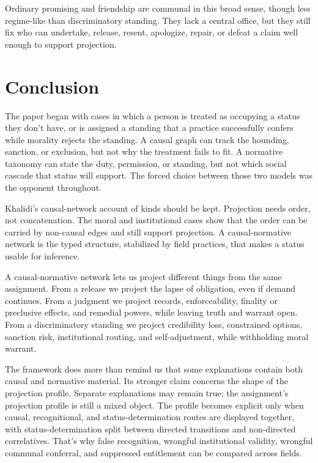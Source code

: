\documentclass[12pt]{article}
\begin{document}
Ordinary promising and friendship are communal in this broad sense, though less regime-like than discriminatory standing. They lack a central office, but they still fix who can undertake, release, resent, apologize, repair, or defeat a claim well enough to support projection.

\section{Conclusion}
\label{sec:conclusion}

The paper began with cases in which a person is treated as occupying a status they don't have, or is assigned a standing that a practice successfully confers while morality rejects the standing. A causal graph can track the hounding, sanction, or exclusion, but not why the treatment fails to fit. A normative taxonomy can state the duty, permission, or standing, but not which social cascade that status will support. The forced choice between those two models was the opponent throughout.

Khalidi's causal-network account of kinds should be kept. Projection needs order, not concatenation. The moral and institutional cases show that the order can be carried by non-causal edges and still support projection. A causal-normative network is the typed structure, stabilized by field practices, that makes a status usable for inference.

A causal-normative network lets us project different things from the same assignment. From a release we project the lapse of obligation, even if demand continues. From a judgment we project records, enforceability, finality or preclusive effects, and remedial powers, while leaving truth and warrant open. From a discriminatory standing we project credibility loss, constrained options, sanction risk, institutional routing, and self-adjustment, while withholding moral warrant.

The framework does more than remind us that some explanations contain both causal and normative material. Its stronger claim concerns the shape of the projection profile. Separate explanations may remain true; the assignment's projection profile is still a mixed object. The profile becomes explicit only when causal, recognitional, and status-determination routes are displayed together, with status-determination split between directed transitions and non-directed correlatives. That's why false recognition, wrongful institutional validity, wrongful communal conferral, and suppressed entitlement can be compared across fields.
\end{document}
